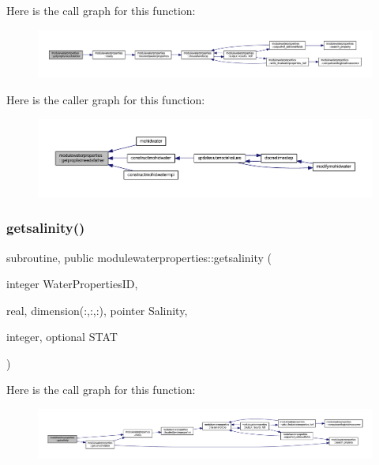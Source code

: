 Here is the call graph for this function\+:\nopagebreak
\begin{figure}[H]
\begin{center}
\leavevmode
\includegraphics[width=350pt]{namespacemodulewaterproperties_ac8bf28f0c63fb495a5f90cf0d6563ae6_cgraph}
\end{center}
\end{figure}
Here is the caller graph for this function\+:\nopagebreak
\begin{figure}[H]
\begin{center}
\leavevmode
\includegraphics[width=350pt]{namespacemodulewaterproperties_ac8bf28f0c63fb495a5f90cf0d6563ae6_icgraph}
\end{center}
\end{figure}
\mbox{\label{namespacemodulewaterproperties_a3bb9d317e5be992645961cb331bdb55a}} 
\subsubsection{\texorpdfstring{getsalinity()}{getsalinity()}}
{\footnotesize\ttfamily subroutine, public modulewaterproperties\+::getsalinity (\begin{DoxyParamCaption}\item[{integer}]{Water\+Properties\+ID,  }\item[{real, dimension(\+:,\+:,\+:), pointer}]{Salinity,  }\item[{integer, optional}]{S\+T\+AT }\end{DoxyParamCaption})}

Here is the call graph for this function\+:\nopagebreak
\begin{figure}[H]
\begin{center}
\leavevmode
\includegraphics[width=350pt]{namespacemodulewaterproperties_a3bb9d317e5be992645961cb331bdb55a_cgraph}
\end{center}
\end{figure}
\mbox{\label{namespacemodulewaterproperties_a627fb9974f1a0e254f8b0f6dfa4653ea}} 
